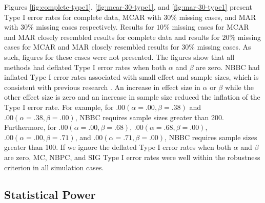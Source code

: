 \documentclass[man]{apa7}\usepackage[]{graphicx}\usepackage[]{xcolor}
\begin{document}
Figures
\ref{fig:complete-type1},
\ref{fig:mcar-30-type1},
and
\ref{fig:mar-30-type1}
present Type I error rates
for complete data,
MCAR with $30\%$ missing cases,
and MAR with $30\%$ missing cases
respectively.
Results for $10\%$ missing cases for MCAR and MAR closely resembled
results for complete data and
results for $20\%$ missing cases for MCAR and MAR closely resembled
results for $30\%$ missing cases.
As such,
figures for these cases were not presented.
The figures show that all methods had deflated Type I error rates when both ${\alpha}$ and ${\beta}$ are zero.
NBBC had inflated Type I error rates associated with small effect and sample sizes,
which is consistent with previous research
\parencite[e.g.,][]{Lib-Mediation-Monte-Carlo-Method-MacKinnon-2004,
Lib-Mediation-Bootstrap-Biesanz-2010,
Lib-Mediation-Bootstrap-Hayes-2013,
Lib-Mediation-Bootstrap-Tofighi-2020}.
An increase in effect size in ${\alpha}$ or ${\beta}$ while the other effect size is zero and an increase in sample size reduced the inflation of the Type I error rate.
For example,
for $.00 \left( \alpha = .00, \beta = .38 \right)$ and $.00 \left( \alpha = .38, \beta = .00 \right)$,
NBBC requires sample sizes greater than 200.
Furthermore,
for $.00 \left( \alpha = .00, \beta = .68 \right)$,
$.00 \left( \alpha = .68, \beta = .00 \right)$,
$.00 \left( \alpha = .00, \beta = .71 \right)$, and
$.00 \left( \alpha = .71, \beta = .00 \right)$,
NBBC requires sample sizes greater than 100.
If we ignore the deflated Type I error rates when both ${\alpha}$ and ${\beta}$ are zero,
MC,
NBPC,
and SIG Type I error rates were well within the robustness criterion in all simulation cases.

\subsection{Statistical Power}
\end{document}
